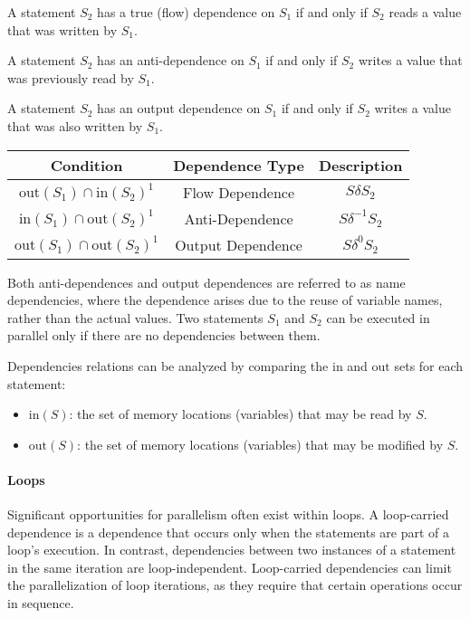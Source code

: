 \begin{definition}
    A statement $S_2$ has a true (flow) dependence on $S_1$ if and only if $S_2$ reads a value that was written by $S_1$.
\end{definition}
\begin{definition}
    A statement $S_2$ has an anti-dependence on $S_1$ if and only if $S_2$ writes a value that was previously read by $S_1$.
\end{definition}
\begin{definition}
    A statement $S_2$ has an output dependence on $S_1$ if and only if $S_2$ writes a value that was also written by $S_1$.
\end{definition}
\renewcommand*{\arraystretch}{2}
\begin{table}[H]
    \centering
    \begin{tabular}{|c|c|c|}
    \hline
    \textbf{Condition} & \textbf{Dependence Type} & \textbf{Description} \\
    \hline
    $\text{out}(S_1) \cap \text{in}(S_2)^1$ & Flow Dependence & $S\delta S_2$ \\
    \hline
    $\text{in}(S_1) \cap \text{out}(S_2)^1$ & Anti-Dependence & $S\delta^{-1} S_2$ \\
    \hline
    $\text{out}(S_1) \cap \text{out}(S_2)^1$ & Output Dependence & $S\delta^0 S_2$ \\
    \hline
    \end{tabular}
\end{table}
\renewcommand*{\arraystretch}{1}
Both anti-dependences and output dependences are referred to as name dependencies, where the dependence arises due to the reuse of variable names, rather than the actual values.
Two statements $S_1$ and $S_2$ can be executed in parallel only if there are no dependencies between them. 

Dependencies relations can be analyzed by comparing the $\text{in}$ and $\text{out}$ sets for each statement:
\begin{itemize}
    \item $\text{in}(S)$: the set of memory locations (variables) that may be read by $S$.
    \item $\text{out}(S)$: the set of memory locations (variables) that may be modified by $S$.
\end{itemize}

\paragraph*{Loops}
Significant opportunities for parallelism often exist within loops. 
A loop-carried dependence is a dependence that occurs only when the statements are part of a loop's execution. 
In contrast, dependencies between two instances of a statement in the same iteration are loop-independent.
Loop-carried dependencies can limit the parallelization of loop iterations, as they require that certain operations occur in sequence.